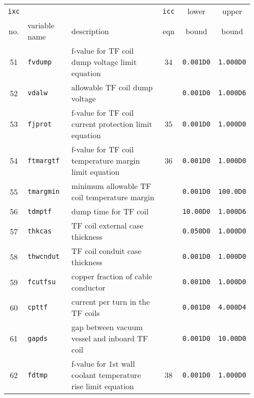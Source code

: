 \documentclass[11pt,a4paper]{report}
\begin{document}
\begin{table}[tbph]
\footnotesize
\begin{center}

\begin{tabular}{||c|l|l|c|c|c||} \hline
\texttt{ixc} &           &                                                         & \texttt{icc} & lower        & upper       \\
no. & variable name     & description                                             & eqn & bound        & bound       \\ \hline
51  & \texttt{fvdump}   & f-value for TF coil dump voltage limit equation         & 34  & \texttt{0.001D0} & \texttt{1.000D0} \\
52  & \texttt{vdalw}    & allowable TF coil dump voltage                          &     & \texttt{0.001D0} & \texttt{1.000D6} \\
53  & \texttt{fjprot}   & f-value for TF coil current protection limit equation   & 35  & \texttt{0.001D0} & \texttt{1.000D0} \\
54  & \texttt{ftmargtf} & f-value for TF coil temperature margin limit equation   & 36  & \texttt{0.001D0} & \texttt{1.000D0} \\
55  & \texttt{tmargmin} & minimum allowable TF coil temperature margin            &     & \texttt{0.001D0} & \texttt{100.0D0} \\
56  & \texttt{tdmptf}   & dump time for TF coil                                   &     & \texttt{10.00D0} & \texttt{1.000D6} \\
57  & \texttt{thkcas}   & TF coil external case thickness                         &     & \texttt{0.050D0} & \texttt{1.000D0} \\
58  & \texttt{thwcndut} & TF coil conduit case thickness                          &     & \texttt{0.001D0} & \texttt{1.000D0} \\
59  & \texttt{fcutfsu}  & copper fraction of cable conductor                      &     & \texttt{0.001D0} & \texttt{1.000D0} \\
60  & \texttt{cpttf}    & current per turn in the TF coils                        &     & \texttt{0.001D0} & \texttt{4.000D4} \\
61  & \texttt{gapds}    & gap between vacuum vessel and inboard TF coil           &     & \texttt{0.001D0} & \texttt{10.00D0} \\
62  & \texttt{fdtmp}    & f-value for 1st wall coolant temperature rise limit equation & 38  & \texttt{0.001D0} & \texttt{1.000D0} \\

\end{tabular}
\end{center}
\end{table}
\end{document}
